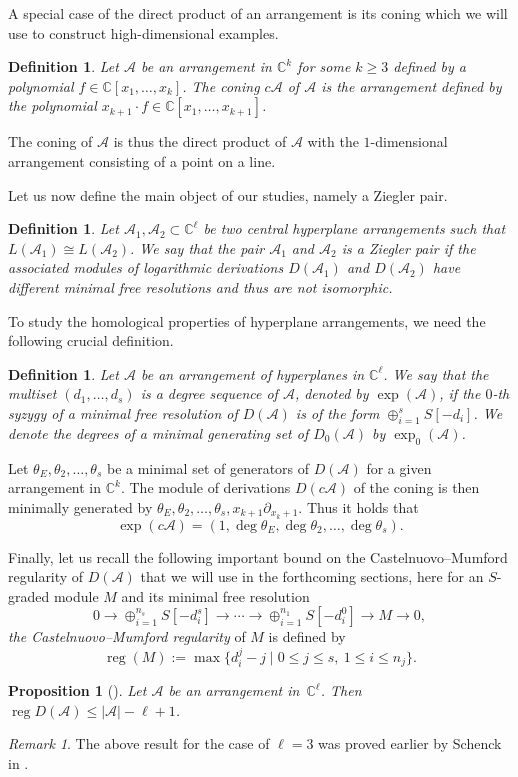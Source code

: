 \documentclass[a4paper,11pt]{amsart}
\def\CC{{\mathbb{C}}}%
\def\C{{\mathbb{C}}}%
\def\A{{\mathcal{A}}}%
\def\C{{\mathcal{C}}}%
\DeclareMathOperator{\reg}{reg}
\numberwithin{equation}{section}
\newtheorem{prop}[theorem]{Proposition}
\newtheorem{define}[theorem]{Definition}
\theoremstyle{remark}
\newtheorem{rem}[theorem]{Remark}
\begin{document}
A special case of the direct product of an arrangement is its coning which we will use to construct high-dimensional examples.
\begin{define}
	Let $\A$ be an arrangement in $\CC^k$ for some $k\ge 3$ defined by a polynomial $f\in \CC[x_1,\dots,x_k]$.
	The \emph{coning} $c\A$ of $\A$ is the arrangement defined by the polynomial $x_{k+1}\cdot f\in \CC[x_1,\dots,x_{k+1}]$.
\end{define}

The coning of $\A$ is thus the direct product of $\A$ with the $1$-dimensional arrangement consisting of a point on a line.

Let us now define the main object of our studies, namely a Ziegler pair.

\begin{define}
Let $\mathcal{A}_{1}, \mathcal{A}_{2} \subset \mathbb{C}^{\ell}$ be two central hyperplane arrangements such that $L(\mathcal{A}_{1}) \cong L(\mathcal{A}_{2})$. We say that the pair $\mathcal{A}_{1}$ and $\mathcal{A}_{2}$ is a \emph{Ziegler pair} if the associated modules of logarithmic derivations $D(\mathcal{A}_{1})$ and $D(\mathcal{A}_{2})$  have different minimal free resolutions and thus are not isomorphic.
\end{define}
To study the homological properties of hyperplane arrangements, we need the following crucial definition. 

\begin{define}
	Let $\A$ be an arrangement of hyperplanes in $\CC^\ell$. We say that the multiset $(d_1,\ldots,d_s)$ is a \emph{degree sequence} of $\A$, denoted by $\exp(\A)$, if 
	the $0$-th syzygy of a minimal free resolution of $D(\A)$ is of the form 
	$\oplus_{i=1}^s S[-d_i]$.
	We denote the degrees of a minimal generating set of  $D_0(\A)$ by $\exp_0(\A)$.
	\label{degreesequence}
\end{define}

Let $\theta_E,\theta_2,\dots,\theta_s$ be a minimal set of generators of $D(\A)$ for a given arrangement in $\CC^k$.
The module of derivations $D(c\A)$ of the coning is then minimally generated by $\theta_E,\theta_2,\dots,\theta_s,x_{k+1}\partial_{x_k+1}$.
Thus it holds that
\[
	\exp(c\A)=(1,\deg \theta_E,\deg \theta_2,\dots,\deg\theta_s).
\]

Finally, let us recall the following important bound on the Castelnuovo--Mumford regularity of $D(\A)$ that we will use in the forthcoming sections, here for an $S$-graded module $M$ and its minimal free resolution
$$
0 \rightarrow \oplus_{i=1}^{n_s} S[-d_i^s] \rightarrow 
\cdots \rightarrow \oplus_{i=1}^{n_1} S[-d_i^0] \rightarrow M \rightarrow 0,
$$
\textit{the Castelnuovo--Mumford regularity} of $M$ is defined by 
$$
\reg(M):=\max \{ d_{i}^j -j \mid 0 \le j \le s,\ 1 \le i \le n_j\}.
$$
\begin{prop}[{\cite[Proposition 1.2]{MS}}]
	Let $\A$ be an arrangement in~$\CC^\ell$. Then 
	$\reg D(\A) \le |\A|-\ell+1$.
	\label{MS}
\end{prop}
\begin{rem}
The above result for the case of $\ell=3$ was proved earlier by Schenck in \cite[Corollary 3.5]{Sch}.
\end{rem}
\end{document}

